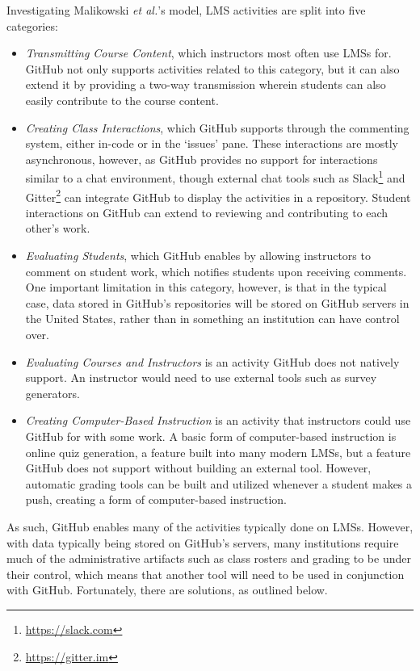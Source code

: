 Investigating Malikowski \textit{et al.}'s \cite{malikowski2007model} model, LMS activities are split into five categories:
\begin{itemize}
\item \emph{Transmitting Course Content}, which instructors most often use LMSs for. GitHub not only supports activities related to this category, but it can also extend it by providing a two-way transmission wherein students can also easily contribute to the course content.
\item \emph{Creating Class Interactions}, which GitHub supports through the commenting system, either in-code or in the `issues' pane. These interactions are mostly asynchronous, however, as GitHub provides no support for interactions similar to a chat environment, though external chat tools such as Slack\footnote{\url{https://slack.com}} and Gitter\footnote{\url{https://gitter.im}} can integrate GitHub to display the activities in a repository. Student interactions on GitHub can extend to reviewing and contributing to each other's work.
\item \emph{Evaluating Students}, which GitHub enables by allowing instructors to comment on student work, which notifies students upon receiving comments. One important limitation in this category, however, is that in the typical case, data stored in GitHub's repositories will be stored on GitHub servers in the United States, rather than in something an institution can have control over.
\item \emph{Evaluating Courses and Instructors} is an activity GitHub does not natively support. An instructor would need to use external tools such as survey generators.
\item \emph{Creating Computer-Based Instruction} is an activity that instructors could use GitHub for with some work. A basic form of computer-based instruction is online quiz generation, a feature built into many modern LMSs, but a feature GitHub does not support without building an external tool. However, automatic grading tools can be built and utilized whenever a student makes a push, creating a form of computer-based instruction.
\end{itemize}

As such, GitHub enables many of the activities typically done on LMSs. However, with data typically being stored on GitHub's servers, many institutions require much of the administrative artifacts such as class rosters and grading to be under their control, which means that another tool will need to be used in conjunction with GitHub. Fortunately, there are solutions, as outlined below.

